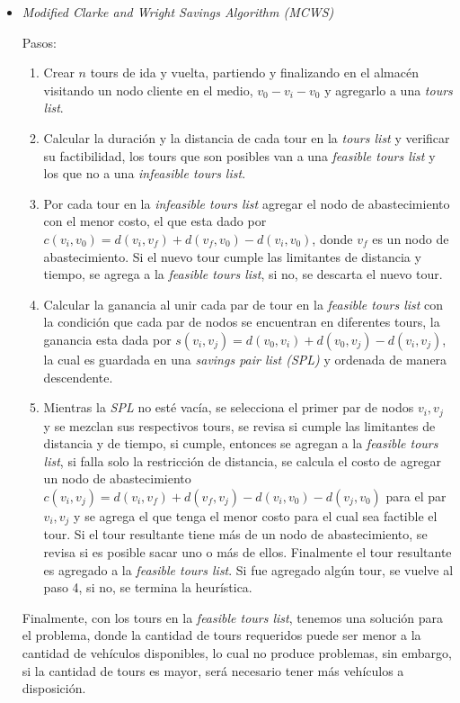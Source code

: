 \documentclass[letter, 10pt]{article}
\begin{document}
\begin{itemize}
\item \textit{Modified Clarke and Wright Savings Algorithm (MCWS)}

Pasos:
	\begin{enumerate}
	\item Crear \(n\) tours de ida y vuelta, partiendo y finalizando en el almacén visitando un nodo cliente en el medio,
	 \(v_0 - v_i - v_0\) y agregarlo a una \textit{tours list}.
	 \item Calcular la duración y la distancia de cada tour en la \textit{tours list} y verificar su factibilidad,
	 	los tours que son posibles van a una \textit{feasible tours list} y los que no
	 	a una \textit{infeasible tours list}.
	 \item Por cada tour en la \textit{infeasible tours list} agregar el nodo de abastecimiento con el menor costo, el
	 que esta dado por \(c(v_i,v_0) = d(v_i, v_f) + d(v_f, v_0) - d(v_i,v_0)\), donde \(v_f\) es un nodo de
	  abastecimiento. Si el nuevo tour cumple las limitantes de distancia y tiempo, se agrega a la \textit{feasible tours list}, si no, se descarta el nuevo tour.
	  \item Calcular la ganancia al unir cada par de tour en la \textit{feasible tours list} con la condición que
	  cada par de nodos se encuentran en diferentes tours, la ganancia esta dada por
	  \(s(v_i,v_j) = d(v_0,v_i) + d(v_0, v_j) - d(v_i, v_j)\), la cual es guardada en una
	   \textit{savings pair list (SPL)} y ordenada de manera descendente.
	   \item Mientras la \textit{SPL} no esté vacía, se selecciona el primer par de nodos \(v_i, v_j\)
	   y se mezclan sus respectivos
	   tours, se revisa si cumple las limitantes de distancia y de tiempo, si cumple, entonces se agregan a
	   la \textit{feasible tours list}, si falla solo la restricción de distancia, se calcula el costo de agregar
	   un nodo de abastecimiento \(c(v_i,v_j) = d(v_i, v_f) + d(v_f, v_j) - d(v_i,v_0) - d(v_j,v_0)\) para el par
	   \(v_i,v_j\) y se agrega el que tenga el menor costo para el cual sea factible el tour. Si el tour resultante
	   tiene más de un nodo de abastecimiento, se revisa si es posible sacar uno o más de ellos. Finalmente el tour
	   resultante es agregado a la \textit{feasible tours list}.
	   Si fue agregado algún tour, se vuelve al paso 4, si no, se termina la heurística.
	\end{enumerate}
	
	Finalmente, con los tours en la \textit{feasible tours list}, tenemos una solución para el problema, donde la 
	cantidad de tours requeridos puede ser menor a la cantidad de vehículos disponibles, lo cual no produce problemas,
	sin embargo, si la cantidad de tours es mayor, será necesario tener más vehículos a disposición.
	

\end{itemize}
\end{document}
